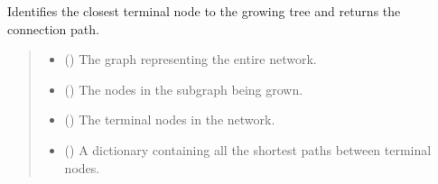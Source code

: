 \documentclass[letterpaper,10pt,english]{sphinxmanual}
\begin{document}
\begin{fulllineitems}
\label{\detokenize{pysewer:pysewer.routing.find_rsph_path}}
\pysigstartsignatures
{}
\pysigstopsignatures
\sphinxAtStartPar
Identifies the closest terminal node to the growing tree and returns the connection path.
\begin{quote}\begin{description}
\begin{itemize}
\item {} 
\sphinxAtStartPar
{} () \textendash{} The graph representing the entire network.

\item {} 
\sphinxAtStartPar
{} (\sphinxstyleliteralemphasis{\sphinxupquote{{[}}}\sphinxstyleliteralemphasis{\sphinxupquote{{]}}}) \textendash{} The nodes in the subgraph being grown.

\item {} 
\sphinxAtStartPar
{} (\sphinxstyleliteralemphasis{\sphinxupquote{{[}}}\sphinxstyleliteralemphasis{\sphinxupquote{{]}}}) \textendash{} The terminal nodes in the network.

\item {} 
\sphinxAtStartPar
{} () \textendash{} A dictionary containing all the shortest paths between terminal nodes.


\end{itemize}
\end{description}
\end{quote}
\end{fulllineitems}
\end{document}
